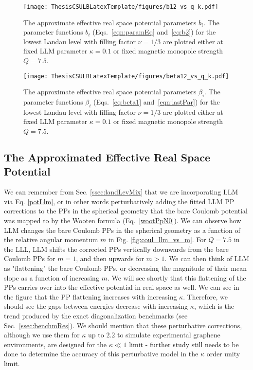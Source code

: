     \begin{figure}[h]
    \begin{center}
    \texttt{[image: ThesisCSULBLatexTemplate/figures/b12\_vs\_q\_k.pdf]}
    \caption[The approximate effective real space potential parameters $b_i$.]{The approximate effective real space potential parameters $b_i$. The parameter functions $b_i$ (Eqs.~\ref{eqn:paramEq} and~\ref{eq:b2}) for the lowest Landau level with filling factor $\nu=1/3$ are plotted either at fixed LLM parameter $\kappa=0.1$ or fixed magnetic monopole strength $Q=7.5$.}
    \label{fig:b12_vs_q_k} 
    \end{center}
    \end{figure}
    
    \begin{figure}[h]
    \begin{center}
    \texttt{[image: ThesisCSULBLatexTemplate/figures/beta12\_vs\_q\_k.pdf]}
    \caption[The approximate effective real space potential parameters $\beta_i$.]{The approximate effective real space potential parameters $\beta_i$. The parameter functions $\beta_i$ (Eqs.~\ref{eq:beta1} and~\ref{eqn:lastPar}) for the lowest Landau level with filling factor $\nu=1/3$ are plotted either at fixed LLM parameter $\kappa=0.1$ or fixed magnetic monopole strength $Q=7.5$.}
    \label{fig:beta12_vs_q_k} 
    \end{center}
    \end{figure}
    
    \subsection{The Approximated Effective Real Space Potential} \label{ssec:apprEffPot}
    
    We can remember from Sec. \ref{ssec:landLevMix} that we are incorporating LLM via Eq. \ref{potLlm}, or in other words perturbatively adding the fitted LLM PP corrections to the PPs in the spherical geometry that the bare Coulomb potential was mapped to by the Wooten formula (Eq.~\ref{wootPpN0}). We can observe how LLM changes the bare Coulomb PPs in the spherical geometry as a function of the relative angular momentum $m$ in Fig. \ref{fig:coul_llm_vs_m}. For $Q=7.5$ in the LLL, LLM shifts the corrected PPs vertically downwards from the bare Coulomb PPs for $m=1$, and then upwards for $m>1$. We can then think of LLM as "flattening" the bare Coulomb PPs, or decreasing the magnitude of their mean slope as a function of increasing $m$. We will see shortly that this flattening of the PPs carries over into the effective potential in real space as well. We can see in the figure that the PP flattening increases with increasing $\kappa$. Therefore, we should see the gaps between energies decrease with increasing $\kappa$, which is the trend produced by the exact diagonalization benchmarks (see Sec.~\ref{ssec:benchmRes}). We should mention that these perturbative corrections, although we use them for $\kappa$ up to 2.2 to simulate experimental graphene environments, are designed for the $\kappa\ll1$ limit - further study still needs to be done to determine the accuracy of this perturbative model in the $\kappa$ order unity limit. 
    
